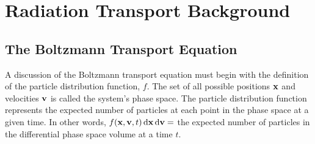 \documentclass[../doc.tex]{subfiles}
\begin{document}
\chapter{Radiation Transport Background} \label{chap:transport}
\section{The Boltzmann Transport Equation}
A discussion of the Boltzmann transport equation must begin with the definition of the particle distribution function, $f$. 
The set of all possible positions $\boldsymbol{\mathrm{x}}$ and velocities $\boldsymbol{\mathrm{v}}$ is called the system's phase space. The particle distribution function represents the expected number of particles at each point in the phase space at a given time. In other words, $f(\boldsymbol{\mathrm{x}},\boldsymbol{\mathrm{v}},t) \mathop{}\!\mathrm{d} \boldsymbol{\mathrm{x}} \mathop{}\!\mathrm{d} \boldsymbol{\mathrm{v}} = $ the expected number of particles in the differential phase space volume at a time $t$. 
\end{document}
